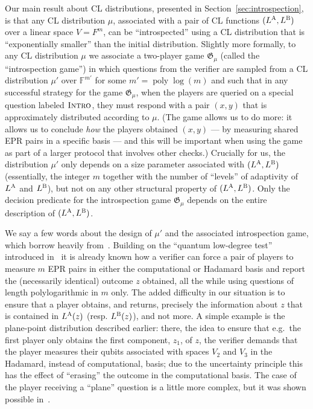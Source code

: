 \documentclass[11pt]{article}
\theoremstyle{definition}
\newcommand{\F}{\ensuremath{\mathbb{F}}}
\DeclareMathOperator{\poly}{poly}
\newcommand{\game}{\mathfrak{G}}
\newcommand{\labelstyle}[1]{\ensuremath{\textsc{#1}}\xspace}
\newcommand{\alice}{\labelstyle{A}}
\newcommand{\bob}{\labelstyle{B}}
\newcommand{\typestyle}[1]{\ensuremath{\textsc{#1}}\xspace}
\newcommand{\Introspect}{\typestyle{Intro}}
\begin{document}
Our main result about CL distributions, presented in Section~\ref{sec:introspection}, is that any CL distribution $\mu$, associated with a pair of CL functions $(L^\alice,L^\bob)$ over a linear space $V=F^m$, can be ``introspected'' using a CL distribution that is ``exponentially smaller'' than the initial distribution. Slightly more formally, to any CL distribution $\mu$ we associate a two-player game $\game_\mu$ (called the ``introspection game'') in which questions from the verifier are sampled from a CL distribution $\mu'$ over $\F^{m'}$ for some $m' = \poly\log(m)$ and such that in any successful strategy for the game $\game_\mu$, when the players are queried on a special question labeled $\Introspect$, they must respond with a pair $(x,y)$ that is approximately distributed according to $\mu$.
(The game allows us to do more: it allows us to conclude \emph{how} the players obtained $(x,y)$ --- by measuring shared EPR pairs in a specific basis --- and this will be important when using the game as part of a larger protocol that involves other checks.) 
Crucially for us, the distribution $\mu'$ only depends on a size parameter associated with $(L^\alice,L^\bob)$ (essentially, the integer $m$ together with the number of ``levels'' of adaptivity of $L^\alice$ and $L^\bob$), but not on any other structural property of $(L^\alice,L^\bob)$. Only the decision predicate for the introspection game $\game_\mu$ depends on the entire description of $(L^\alice,L^\bob)$.

We say a few words about the design of $\mu'$ and the associated introspection game, which borrow heavily from~\cite{NW19}. Building on the ``quantum low-degree test'' introduced in~\cite{natarajan2018low} it is already known how a verifier can force a pair of players to measure $m$ EPR pairs in either the computational or Hadamard basis and report the (necessarily identical) outcome $z$ obtained, all the while using questions of length polylogarithmic in $m$ only. The added difficulty in our situation is to ensure that a player obtains, and returns, precisely the information about $z$ that is contained in $L^\alice(z)$ (resp. $L^\bob(z)$), and not more. A simple example is the plane-point distribution described earlier: there, the idea to ensure that e.g.\ the first player only obtains the first component, $z_1$, of $z$, the verifier demands that the player measures their qubits associated with spaces $V_2$ and $V_3$ in the Hadamard, instead of computational, basis; due to the uncertainty principle this has the effect of ``erasing'' the outcome in the computational basis.  The case of the player receiving a ``plane'' question is a little more complex, but it was shown possible in~\cite{NW19}.
\end{document}
